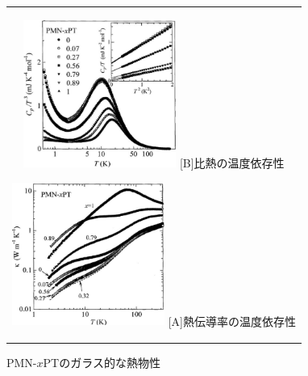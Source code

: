\documentclass[10pt,b5paper,papersize,dvipdfmx]{jsbook}
\begin{document}
\begin{figure}[htbp]
  \begin{center}
      \begin{tabular}{c}  
      \begin{minipage}{0.5\hsize}
          \begin{center}
            \includegraphics[clip, width=5cm]{img/relaxor-heat-capacity.pdf}
            \hspace{1.6cm} [B]比熱の温度依存性
          \end{center}
        \end{minipage}
        \begin{minipage}{0.5\hsize}
          \begin{center}
            \includegraphics[clip, width=5cm]{img/relaxor-thermal-conductivity.pdf}
            \hspace{1.6cm} [A]熱伝導率の温度依存性
      \end{center}
      \end{minipage}
      \end{tabular}
      \caption{PMN-$x$PTのガラス的な熱物性\cite{relaxCT}}
      \label{fig:lena}
  \end{center}
\end{figure}
\end{document}
